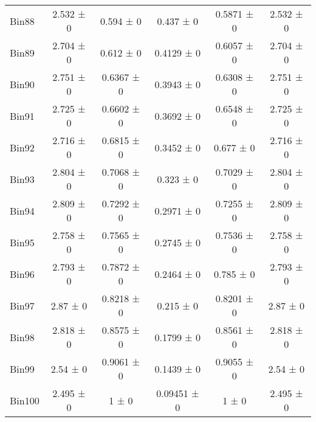 \begin{tabular}{@{\extracolsep{4pt}}lccccc@{}}
     Bin88 & 2.532 ± 0 & 0.594 ± 0 & 0.437 ± 0 & 0.5871 ± 0 & 2.532 ± 0 \\ 
     Bin89 & 2.704 ± 0 & 0.612 ± 0 & 0.4129 ± 0 & 0.6057 ± 0 & 2.704 ± 0 \\ 
     Bin90 & 2.751 ± 0 & 0.6367 ± 0 & 0.3943 ± 0 & 0.6308 ± 0 & 2.751 ± 0 \\ 
     Bin91 & 2.725 ± 0 & 0.6602 ± 0 & 0.3692 ± 0 & 0.6548 ± 0 & 2.725 ± 0 \\ 
     Bin92 & 2.716 ± 0 & 0.6815 ± 0 & 0.3452 ± 0 & 0.677 ± 0 & 2.716 ± 0 \\ 
     Bin93 & 2.804 ± 0 & 0.7068 ± 0 & 0.323 ± 0 & 0.7029 ± 0 & 2.804 ± 0 \\ 
     Bin94 & 2.809 ± 0 & 0.7292 ± 0 & 0.2971 ± 0 & 0.7255 ± 0 & 2.809 ± 0 \\ 
     Bin95 & 2.758 ± 0 & 0.7565 ± 0 & 0.2745 ± 0 & 0.7536 ± 0 & 2.758 ± 0 \\ 
     Bin96 & 2.793 ± 0 & 0.7872 ± 0 & 0.2464 ± 0 & 0.785 ± 0 & 2.793 ± 0 \\ 
     Bin97 & 2.87 ± 0 & 0.8218 ± 0 & 0.215 ± 0 & 0.8201 ± 0 & 2.87 ± 0 \\ 
     Bin98 & 2.818 ± 0 & 0.8575 ± 0 & 0.1799 ± 0 & 0.8561 ± 0 & 2.818 ± 0 \\ 
     Bin99 & 2.54 ± 0 & 0.9061 ± 0 & 0.1439 ± 0 & 0.9055 ± 0 & 2.54 ± 0 \\ 
     Bin100 & 2.495 ± 0 & 1 ± 0 & 0.09451 ± 0 & 1 ± 0 & 2.495 ± 0 \\ 
\hline\hline
  \end{tabular}
